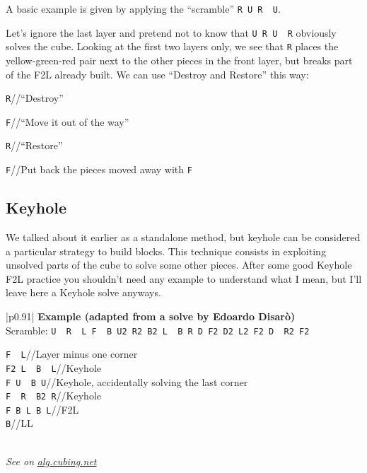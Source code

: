 \documentclass[11pt,a4paper]{book}
\newcommand{\p}{\textquotesingle}
\newcommand{\m}{\texttt}
\newcommand{\ps}{\p\,\,}
\newcommand{\comment}[1]{{\color{gray}\quad//#1}}
\begin{document}
A basic example is given by applying the ``scramble'' \m{R U R\ps U\p}.

\begin{center}

\end{center}

Let's ignore the last layer and pretend not to know that \m{U R U\ps R\p} obviously solves the cube. Looking at the first two layers only, we see that \m{R\p} places the yellow-green-red pair next to the other pieces in the front layer, but breaks part of the F2L already built. We can use “Destroy and Restore” this way:

\bigskip
\m{R\p}\comment{``Destroy''}

\m{F}\comment{``Move it out of the way''}

\m R\comment{``Restore''}

\m{F\p}\comment{Put back the pieces moved away with \m F}

\subsection{Keyhole}

We talked about it earlier as a standalone method, but keyhole can be considered a particular strategy to build blocks. This  technique consists in exploiting unsolved parts of the cube to solve some other pieces. After some good Keyhole F2L practice you shouldn't need any example to understand what I mean, but I'll leave here a Keyhole solve anyways.

\bigskip
\begin{tabular}{|p{}|}
\hline
\textbf{Example (adapted from a solve by Edoardo Disarò)}\\
\hline
Scramble: \m{U\ps R\ps L F\ps B U2 R2 B2 L\ps B R D F2 D2 L2 F2 D\ps R2 F2}\\
\hline
\begin{minipage}[l]{0.650\textwidth}
\m{F\ps L\p}\comment{Layer minus one corner}\\
\m{F2 L\ps B\ps L}\comment{Keyhole}\\
\m{F U\ps B U}\comment{Keyhole, accidentally solving the last corner}\\
\m{F\ps R\ps B2 R}\comment{Keyhole}\\
\m{F B L B L\p}\comment{F2L}\\
\m{B\p}\comment{LL}
\end{minipage}
\begin{minipage}[c]{0.25\textwidth}

\end{minipage}\\
\hline
\emph{See on }\href{https://alg.cubing.net/?setup=U-_R-_L_F-_B_U2_R2_B2_L-_B_R_D_F2_D2_L2_F2_D-_R2_F2&alg=F-_L-_\%2F\%2FLayer_minus_one_corner\%0AF2_L-_B-_L_\%2F\%2FKeyhole\%0AF_U-_B_U_\%2F\%2FKeyhole,_accidentally_solving_the_last_corner\%0AF-_R-_B2_R_\%2F\%2FKeyhole\%0AF_B_L_B_L-_\%2F\%2FF2L\%0AB-_\%2F\%2FLL}{\emph{alg.cubing.net}}\\
\hline
\end{tabular}
\bigskip
\end{document}
